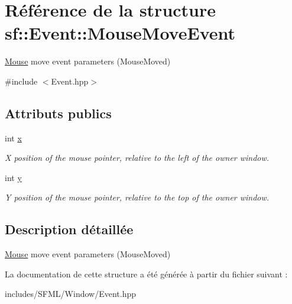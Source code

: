 \hypertarget{structsf_1_1Event_1_1MouseMoveEvent}{}\section{Référence de la structure sf\+:\+:Event\+:\+:Mouse\+Move\+Event}
\label{structsf_1_1Event_1_1MouseMoveEvent}


\hyperlink{classsf_1_1Mouse}{Mouse} move event parameters (Mouse\+Moved)  




{\ttfamily \#include $<$Event.\+hpp$>$}

\subsection*{Attributs publics}
\begin{DoxyCompactItemize}
\item 
\mbox{\label{structsf_1_1Event_1_1MouseMoveEvent_aa3a23809afb905cbb52c66d8512e21fd}} 
int \hyperlink{structsf_1_1Event_1_1MouseMoveEvent_aa3a23809afb905cbb52c66d8512e21fd}{x}
\begin{DoxyCompactList}\small\item\em X position of the mouse pointer, relative to the left of the owner window. \end{DoxyCompactList}\item 
\mbox{\label{structsf_1_1Event_1_1MouseMoveEvent_a86d78a2fba5b3abda16ca059f2392ad4}} 
int \hyperlink{structsf_1_1Event_1_1MouseMoveEvent_a86d78a2fba5b3abda16ca059f2392ad4}{y}
\begin{DoxyCompactList}\small\item\em Y position of the mouse pointer, relative to the top of the owner window. \end{DoxyCompactList}\end{DoxyCompactItemize}


\subsection{Description détaillée}
\hyperlink{classsf_1_1Mouse}{Mouse} move event parameters (Mouse\+Moved) 

La documentation de cette structure a été générée à partir du fichier suivant \+:\begin{DoxyCompactItemize}
\item 
includes/\+S\+F\+M\+L/\+Window/Event.\+hpp\end{DoxyCompactItemize}
